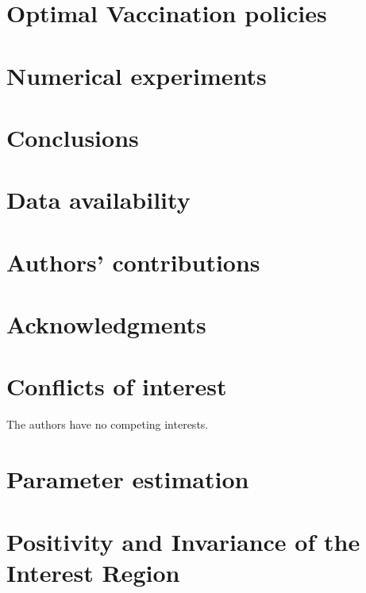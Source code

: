 \documentclass[3p, sort&compress]{elsarticle}
\begin{document}
    \section{Optimal Vaccination policies}
    \label{Sec:OptimalVaccinePolicies}
    
    \section{Numerical experiments}
    \label{Sec:NumericalExperiment}
    
    \section{Conclusions}
    
    \section*{Data availability}
    
    \section*{Authors’ contributions}
    
    \section*{Acknowledgments}
    
    \section*{Conflicts of interest}
    The authors have no competing interests.
    
    
    \appendix
    \section{Parameter estimation}
    
    \section{Positivity and Invariance of the Interest Region}
    \label{apx:positivity_invariace}
    
\end{document}
